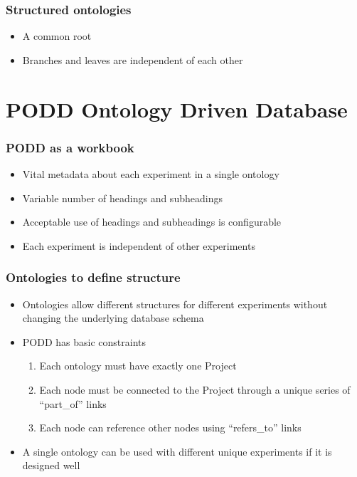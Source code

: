 \documentclass[12pt]{beamer}
\begin{document}
\begin{frame}
\frametitle{Structured ontologies}

\begin{itemize}
 \item A common root
\pause
 \item Branches and leaves are independent of each other
\end{itemize}
\end{frame}

\section{PODD Ontology Driven Database}

\begin{frame}
\frametitle{PODD as a workbook}

\begin{itemize}
 \item Vital metadata about each experiment in a single ontology
\pause
 \item Variable number of headings and subheadings
\pause
 \item Acceptable use of headings and subheadings is configurable
\pause
 \item Each experiment is independent of other experiments
\end{itemize}
\end{frame}

\begin{frame}
\frametitle{Ontologies to define structure}

\begin{itemize}
 \item Ontologies allow different structures for different experiments without changing the underlying database schema
\pause
 \item PODD has basic constraints
\begin{enumerate}
 \item Each ontology must have exactly one Project
 \item Each node must be connected to the Project through a unique series of ``part\_of'' links
 \item Each node can reference other nodes using ``refers\_to'' links
\end{enumerate}
\pause
\item A single ontology can be used with different unique experiments if it is designed well
\end{itemize}
\end{frame}
\end{document}
